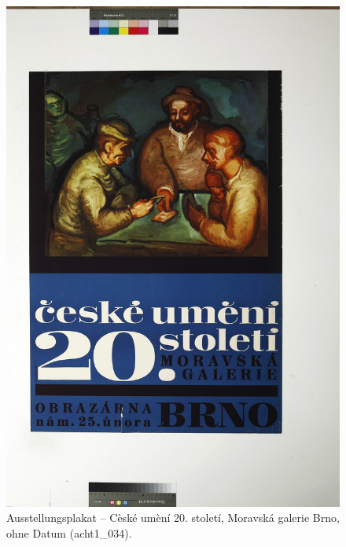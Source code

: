 \documentclass[a4paper,12pt,ngerman]{article}
\begin{document}
\newpage
\begin{figure}[ht]
\includegraphics[width=\linewidth]{Abbildung_39_(acht1_034)}
\centering
\caption{Ausstellungsplakat – Cèské umèní 20. století, Moravská galerie Brno, ohne Datum (acht1\_034).}
\end{figure}
\end{document}
